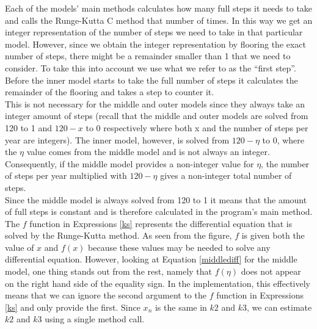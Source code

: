 Each of the models' main methods calculates how many full steps it needs to take and calls the Runge-Kutta C method that number of times. In this way we get an integer representation of the number of steps we need to take in that particular model. However, since we obtain the integer representation by flooring the exact number of steps, there might be a remainder smaller than 1 that we need to consider. To take this into account we use what we refer to as the ``first step''. Before the inner model starts to take the full number of steps it calculates the remainder of the flooring and takes a step to counter it. \\

This is not necessary for the middle and outer models since they always take an integer amount of steps (recall that the middle and outer models are solved from 120 to 1 and $120-x$ to 0 respectively where both x and the number of steps per year are integers). The inner model, however, is solved from $120-\eta$ to 0, where the $\eta$ value comes from the middle model and is not always an integer. Consequently, if the middle model provides a non-integer value for $\eta$, the number of steps per year multiplied with $120-\eta$ gives a non-integer total number of steps. \\

Since the middle model is always solved from 120 to 1 it means that the amount of full steps is constant and is therefore calculated in the program's main method. \\

The $f$ function in Expressions \ref{ks} represents the differential equation that is solved by the Runge-Kutta method. As seen from the figure, $f$ is given both the value of $x$ and $f(x)$ because these values may be needed to solve any differential equation. However, looking at Equation \ref{middlediff} for the middle model, one thing stands out from the rest, namely that $f(\eta)$ does not appear on the right hand side of the equality sign. In the implementation, this effectively means that we can ignore the second argument to the $f$ function in Expressions \ref{ks} and only provide the first. Since $x_n$ is the same in $k2$ and $k3$, we can estimate $k2$ and $k3$ using a single method call. 














